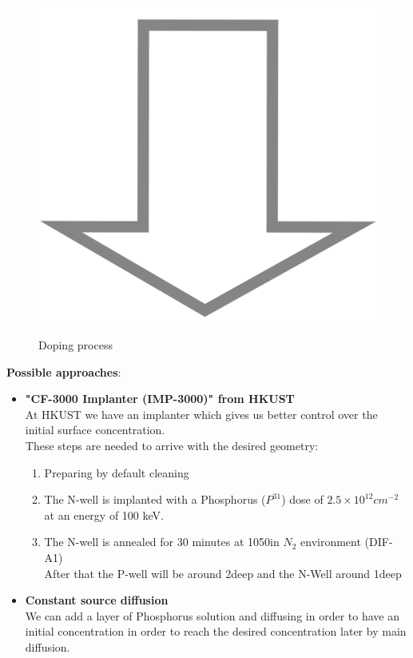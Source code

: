\begin{figure}[H]
	\includegraphics[scale=0.01]{down_arrow.png} \\
	\begin{tikzpicture}[node distance = 3cm, auto, thick,scale=\CrossSectionOnly, every node/.style={transform shape}]
		
	\end{tikzpicture}
	\caption{Doping process}
\end{figure}

\textbf{Possible approaches}:
\begin{itemize}
	\item \textbf{"CF-3000 Implanter (IMP-3000)" from HKUST} \\
	At HKUST we have an implanter which gives us better control over the initial surface concentration. \\
	These steps are needed to arrive with the desired geometry:
	\begin{enumerate}
		\item Preparing by default cleaning
		\item The N-well is implanted with a Phosphorus ($P^{31}$) dose of $2.5\times10^{12}cm^{-2}$ at an energy of 100 keV.
		\item The N-well is annealed for 30 minutes at 1050\degreesC in $N_2$ environment (DIF-A1)\\
		After that the P-well will be around 2\um deep and the N-Well around 1\um deep
	\end{enumerate}
	\item \textbf{Constant source diffusion} \\
	We can add a layer of Phosphorus solution and diffusing in order to have an initial concentration in order to reach the desired concentration later by main diffusion.
\end{itemize}

